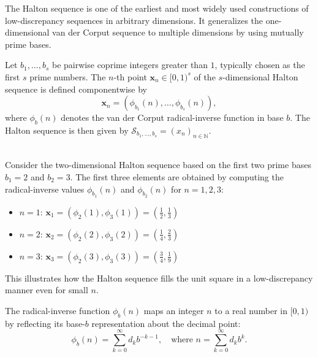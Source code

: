 The Halton sequence is one of the earliest and most widely used constructions of low-discrepancy sequences in arbitrary dimensions. It generalizes the one-dimensional van der Corput sequence to multiple dimensions by using mutually prime bases.

\begin{definition}
Let $b_1, \dots, b_s$ be pairwise coprime integers greater than $1$, typically
chosen as the first $s$ prime numbers. The $n$-th point $\boldsymbol{x}_n \in
[0,1)^s$ of the $s$-dimensional Halton sequence is defined componentwise by
\begin{equation*}
    \boldsymbol{x}_n = \left( \phi_{b_1}(n), \dots, \phi_{b_s}(n) \right),
\end{equation*}
where $\phi_b(n)$ denotes the van der Corput radical-inverse function in base
$b$. The Halton sequence is then given by $\mathcal{S}_{b_1, \dots, b_s} = (x_n)_{n\in \mathbb{N}}$.
\end{definition}

\begin{example} \ \\
Consider the two-dimensional Halton sequence based on the first two prime bases $b_1 = 2$ and $b_2 = 3$. The first three elements are obtained by computing the radical-inverse values $\phi_{b_1}(n)$ and $\phi_{b_2}(n)$ for $n = 1, 2, 3$:

\begin{itemize}
    \item $n = 1$: $\boldsymbol{x}_1 = \left( \phi_2(1), \phi_3(1) \right) = \left( \tfrac{1}{2}, \tfrac{1}{3} \right)$
    \item $n = 2$: $\boldsymbol{x}_2 = \left( \phi_2(2), \phi_3(2) \right) = \left( \tfrac{1}{4}, \tfrac{2}{3} \right)$
    \item $n = 3$: $\boldsymbol{x}_3 = \left( \phi_2(3), \phi_3(3) \right) = \left( \tfrac{3}{4}, \tfrac{1}{9} \right)$
\end{itemize}

This illustrates how the Halton sequence fills the unit square in a low-discrepancy manner even for small $n$.
\end{example}






The radical-inverse function $\phi_b(n)$ maps an integer $n$ to a real number in $[0,1)$ by reflecting its base-$b$ representation about the decimal point:
\begin{equation*}
    \phi_b(n) = \sum_{k=0}^\infty d_k b^{-k-1}, \quad \text{where } n = \sum_{k=0}^\infty d_k b^k.
\end{equation*}

